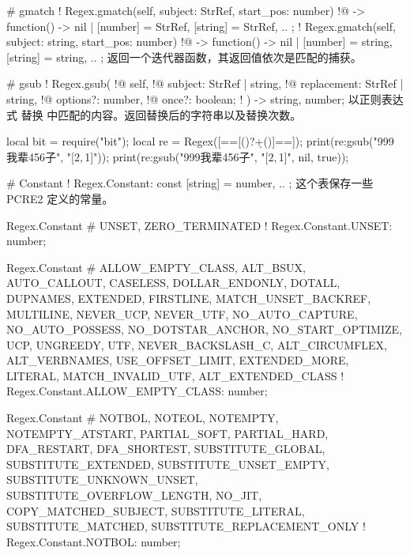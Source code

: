 \documentclass[class=article,doc={kv-usage}]{cusdoc}
\begin{document}
\begin{luadoc*}{}
# gmatch
! Regex.gmatch(self, subject: StrRef, start_pos: number)
!@  -> function() -> nil | { [number] = StrRef, [string] = StrRef, .. };
! Regex.gmatch(self, subject: string, start_pos: number)
!@  -> function() -> nil | { [number] = string, [string] = string, .. };
返回一个迭代器函数，其返回值依次是匹配的捕获。
\end{luadoc*}

\begin{luadoc*}{}
# gsub
! Regex.gsub(
!@  self,
!@  subject: StrRef | string,
!@  replacement: StrRef | string,
!@  options?: number,
!@  once?: boolean;
! ) -> string, number;
以正则表达式  替换  中匹配的内容。返回替换后的字符串以及替换次数。
\end{luadoc*}

\begin{luarun}{}
local bit = require("bit");
local re = Regex([==[(\pL)?\d+()]==]);
print(re:gsub("999我辈456子", "[$2,$1]"));
print(re:gsub("999我辈456子", "[$2,$1]", nil, true));
\end{luarun}

\begin{luadoc*}{}
# Constant
! Regex.Constant: const { [string] = number, .. };
这个表保存一些 PCRE2 定义的常量。
\end{luadoc*}

\begin{luadoc*}{Regex.Constant}
# UNSET, ZERO_TERMINATED
! Regex.Constant.UNSET: number;
\end{luadoc*}

\begin{luadoc*}{Regex.Constant}
# ALLOW_EMPTY_CLASS, ALT_BSUX, AUTO_CALLOUT, CASELESS, DOLLAR_ENDONLY, DOTALL, DUPNAMES, EXTENDED, FIRSTLINE, MATCH_UNSET_BACKREF, MULTILINE, NEVER_UCP, NEVER_UTF, NO_AUTO_CAPTURE, NO_AUTO_POSSESS, NO_DOTSTAR_ANCHOR, NO_START_OPTIMIZE, UCP, UNGREEDY, UTF, NEVER_BACKSLASH_C, ALT_CIRCUMFLEX, ALT_VERBNAMES, USE_OFFSET_LIMIT, EXTENDED_MORE, LITERAL, MATCH_INVALID_UTF, ALT_EXTENDED_CLASS
! Regex.Constant.ALLOW_EMPTY_CLASS: number;
\end{luadoc*}

\begin{luadoc*}{Regex.Constant}
# NOTBOL, NOTEOL, NOTEMPTY, NOTEMPTY_ATSTART, PARTIAL_SOFT, PARTIAL_HARD, DFA_RESTART, DFA_SHORTEST, SUBSTITUTE_GLOBAL, SUBSTITUTE_EXTENDED, SUBSTITUTE_UNSET_EMPTY, SUBSTITUTE_UNKNOWN_UNSET, SUBSTITUTE_OVERFLOW_LENGTH, NO_JIT, COPY_MATCHED_SUBJECT, SUBSTITUTE_LITERAL, SUBSTITUTE_MATCHED, SUBSTITUTE_REPLACEMENT_ONLY
! Regex.Constant.NOTBOL: number;
\end{luadoc*}
\end{document}
